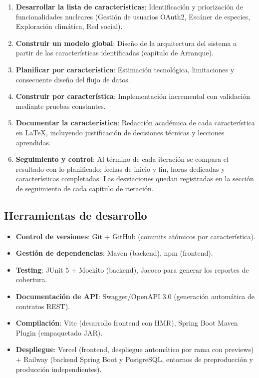 \begin{enumerate}
    \item \textbf{Desarrollar la lista de características}: Identificación y priorización de funcionalidades nucleares (Gestión de usuarios OAuth2, Escáner de especies, Exploración climática, Red social).
    
    \item \textbf{Construir un modelo global}: Diseño de la arquitectura del sistema a partir de las características identificadas (capítulo de Arranque).
    
    \item \textbf{Planificar por característica}: Estimación tecnológica, limitaciones y consecuente diseño del flujo de datos.
    
    \item \textbf{Construir por característica}: Implementación incremental con validación mediante pruebas constantes.
    
    \item \textbf{Documentar la característica}: Redacción académica de cada característica en LaTeX, incluyendo justificación de decisiones técnicas y lecciones aprendidas.

    \item \textbf{Seguimiento y control}: Al término de cada iteración se compara el resultado con lo planificado: fechas de inicio y fin, horas dedicadas y características completadas. Las desviaciones quedan registradas en la sección de seguimiento de cada capítulo de iteración.
\end{enumerate}

\subsection{Herramientas de desarrollo}

\begin{itemize}
    \item \textbf{Control de versiones}: Git + GitHub (commits atómicos por característica).
    \item \textbf{Gestión de dependencias}: Maven (backend), npm (frontend).
    \item \textbf{Testing}: JUnit 5 + Mockito (backend), Jacoco para generar los reportes de cobertura.
    \item \textbf{Documentación de API}: Swagger/OpenAPI 3.0 (generación automática de contratos REST).
    \item \textbf{Compilación}: Vite (desarrollo frontend con HMR), Spring Boot Maven Plugin (empaquetado JAR).
    \item \textbf{Despliegue}: Vercel (frontend, despliegue automático por rama con previews) + Railway (backend Spring Boot y PostgreSQL, entornos de preproducción y producción independientes).
\end{itemize}

